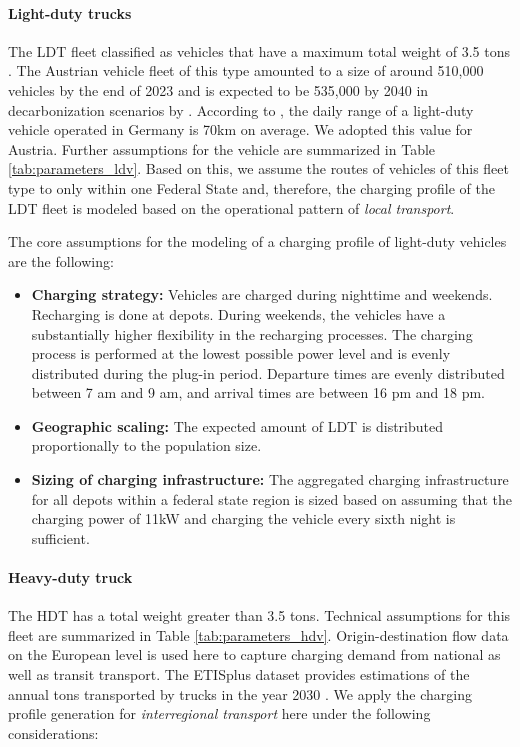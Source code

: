 \documentclass[final,10pt]{elsarticle}
\begin{document}
            \paragraph{Light-duty trucks}
            The \ac{LDT} fleet classified as vehicles that have a maximum total weight of 3.5 tons \cite{usp_nutzfahrzeuge}. The Austrian vehicle fleet of this type amounted to a size of around 510,000 vehicles by the end of 2023 and is expected to be 535,000 by 2040 in decarbonization scenarios by \citet{umweltbundesamt_rep0808}. According to \cite{SCORRANO2021101022}, the  daily range of a light-duty vehicle operated in Germany is 70km on average. We adopted this value for Austria. Further assumptions for the vehicle are summarized in Table \ref{tab:parameters_ldv}. Based on this, we assume the routes of vehicles of this fleet type to only within one Federal State and, therefore, the charging profile of the \ac{LDT} fleet is modeled based on the operational pattern of \textit{local transport}. 

            The core assumptions for the modeling of a charging profile of light-duty vehicles are the following:
            \begin{itemize}
                \item \textbf{Charging strategy:} Vehicles are charged during nighttime and weekends. Recharging is done at depots. During weekends, the vehicles have a substantially higher flexibility in the recharging processes. The charging process is performed at the lowest possible power level and is evenly distributed during the plug-in period. Departure times are evenly distributed between 7 am and 9 am, and arrival times are between 16 pm and 18 pm.
                \item \textbf{Geographic scaling:} The expected amount of \ac{LDT} is distributed proportionally to the population size.
                \item \textbf{Sizing of charging infrastructure:} The aggregated charging infrastructure for all depots within a federal state region is sized based on assuming that the charging power of 11kW and charging the vehicle every sixth night is sufficient.
            \end{itemize} 

            \paragraph*{Heavy-duty truck}
            The \ac{HDT} has a total weight greater than 3.5 tons. Technical assumptions for this fleet are summarized in Table \ref{tab:parameters_hdv}. Origin-destination flow data on the European level is used here to capture charging demand from national as well as transit transport. The ETISplus dataset provides estimations of the annual tons transported by trucks in the year 2030 \cite{speth2021synthetic}. We apply the charging profile generation for \textit{interregional transport} here under the following considerations:
            
\end{document}
